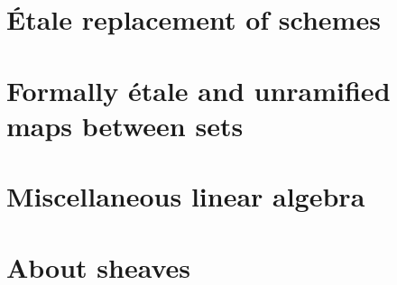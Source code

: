 \documentclass{../util/zariski}
\begin{document}
\section{Étale replacement of schemes}


\section{Formally étale and unramified maps between sets}


\section{Miscellaneous linear algebra}


\section{About sheaves}


\printindex

\printbibliography
\end{document}
